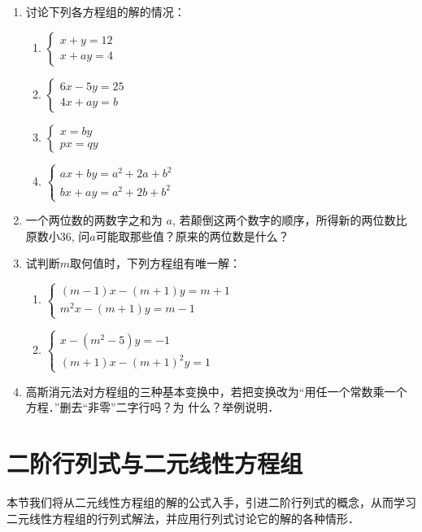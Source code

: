 \begin{enumerate}
    \item 讨论下列各方程组的解的情况：
\begin{multicols}{2}
\begin{enumerate}    
    \item $\begin{cases}
      x+y=12\\ x+ay=4  
    \end{cases}$
    \item $\begin{cases}
        6x-5y=25\\4x+ay=b
    \end{cases}$
    \item $\begin{cases}
        x=by\\px=qy
    \end{cases}$
    \item $\begin{cases}
        ax+by=a^2+2a+b^2\\
        bx+ay=a^2+2b+b^2
    \end{cases}$
\end{enumerate}    
\end{multicols}
    \item 一个两位数的两数字之和为 $a$, 若颠倒这两个数字的顺序，所得新的两位数比原数小36, 问$a$可能取那些值？原来的两位数是什么？
    \item 试判断$m$取何值时，下列方程组有唯一解：
\begin{enumerate}
    \item $\begin{cases}
        (m-1)x-(m+1)y=m+1\\ m^2x-(m+1)y=m-1
    \end{cases}$
    \item $\begin{cases}
x-(m^2-5)y=-1\\ (m+1)x -(m+1)^2y=1       
    \end{cases}$
\end{enumerate}

\item  高斯消元法对方程组的三种基本变换中，若把变换改为“用任一个常数乘一个方程．”删去“非零”二字行吗？为
什么？举例说明．
\end{enumerate}

\section{二阶行列式与二元线性方程组}
本节我们将从二元线性方程组的解的公式入手，引进二阶行列式的概念，从而学习二元线性方程组的行列式解法，并应用行列式讨论它的解的各种情形．

